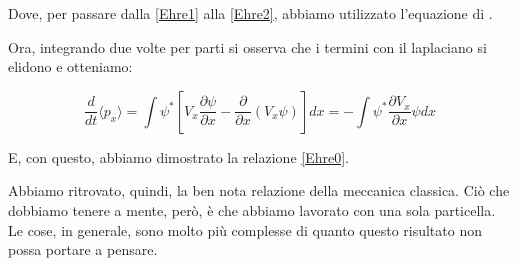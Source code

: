 Dove, per passare dalla \eqref{Ehre1} alla \eqref{Ehre2}, abbiamo utilizzato l'equazione di \scha.

Ora, integrando due volte per parti si osserva che i termini con il laplaciano si elidono e otteniamo:

\begin{equation}
\frac{d}{dt}\langle p_x \rangle = \int{\psi^*\left[V_x\frac{\partial\psi}{\partial x}-\frac{\partial}{\partial x}\left(V_x\psi\right)\right]dx} = -\int{\psi^*\frac{\partial V_x}{\partial x}\psi dx}
\end{equation}

E, con questo, abbiamo dimostrato la relazione \eqref{Ehre0}.

Abbiamo ritrovato, quindi, la ben nota relazione della meccanica classica. Ciò che dobbiamo tenere a mente, però, è che abbiamo lavorato con una sola particella. Le cose, in generale, sono molto più complesse di quanto questo risultato non possa portare a pensare.
%